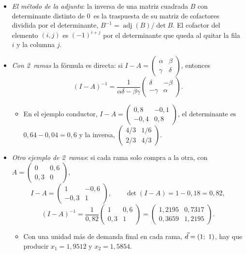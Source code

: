 \documentclass[11pt]{article}
\begin{document}
\begin{itemize}
\item \emph{El método de la adjunta}: la inversa de una matriz cuadrada $B$ con determinante distinto de 0~es la traspuesta de su matriz de cofactores dividida por el determinante, $B^{-1}=\operatorname{adj}(B)/\det B$. El cofactor del elemento $(i,j)$ es $(-1)^{i+j}$ por el determinante que queda al quitar la fila $i$ y la columna $j$.
\item \emph{Con 2~ramas} la fórmula es directa: si $I-A=\begin{pmatrix}\alpha & \beta\\ \gamma & \delta\end{pmatrix}$, entonces
\[
(I-A)^{-1}=\frac{1}{\alpha\delta-\beta\gamma}\begin{pmatrix}\delta & -\beta\\ -\gamma & \alpha\end{pmatrix}.
\]
  \begin{itemize}
  \item En el ejemplo conductor, $I-A=\begin{pmatrix}0{,}8 & -0{,}1\\ -0{,}4 & 0{,}8\end{pmatrix}$, el determinante es $0{,}64-0{,}04=0{,}6$ y la inversa, $\begin{pmatrix}4/3 & 1/6\\ 2/3 & 4/3\end{pmatrix}$.
  \end{itemize}
\item \emph{Otro ejemplo de 2~ramas}: si cada rama solo compra a la otra, con $A=\begin{pmatrix}0 & 0{,}6\\ 0{,}3 & 0\end{pmatrix}$,
\[
I-A=\begin{pmatrix}1 & -0{,}6\\ -0{,}3 & 1\end{pmatrix},\qquad \det(I-A)=1-0{,}18=0{,}82,
\]
\[
(I-A)^{-1}=\frac{1}{0{,}82}\begin{pmatrix}1 & 0{,}6\\ 0{,}3 & 1\end{pmatrix}=\begin{pmatrix}1{,}2195 & 0{,}7317\\ 0{,}3659 & 1{,}2195\end{pmatrix}.
\]
  \begin{itemize}
  \item Con una unidad más de demanda final en cada rama, $\vec{d}=(1;\ 1)$, hay que producir $x_1=1{,}9512$ y $x_2=1{,}5854$.

\end{itemize}
\end{itemize}
\end{document}
